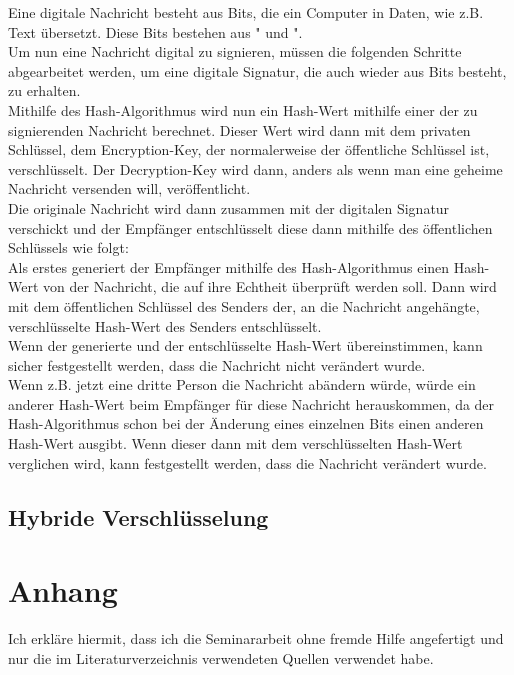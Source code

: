 \documentclass[14pt,a4paper]{scrartcl}
\begin{document}
	Eine digitale Nachricht besteht aus Bits, die ein Computer in Daten, wie z.B. Text übersetzt. Diese Bits bestehen aus " und ". \\ 
	Um nun eine Nachricht digital zu signieren, müssen die folgenden Schritte abgearbeitet werden, um eine digitale Signatur, die auch wieder aus Bits besteht, zu erhalten.\\
	Mithilfe des Hash-Algorithmus wird nun ein Hash-Wert mithilfe einer  der zu signierenden Nachricht berechnet. Dieser Wert wird dann mit dem privaten Schlüssel, dem Encryption-Key, der normalerweise der öffentliche Schlüssel ist, verschlüsselt. %
	Der Decryption-Key wird dann, anders als wenn man eine geheime Nachricht versenden will, veröffentlicht.\\
	Die originale Nachricht wird dann zusammen mit der digitalen Signatur verschickt und der Empfänger entschlüsselt diese dann mithilfe des öffentlichen Schlüssels wie folgt:\\
	Als erstes generiert der Empfänger mithilfe des Hash-Algorithmus einen Hash-Wert von der Nachricht, die auf ihre Echtheit überprüft werden soll. Dann wird mit dem öffentlichen Schlüssel des Senders der, an die Nachricht angehängte, verschlüsselte Hash-Wert des Senders entschlüsselt. \\
Wenn der generierte und der entschlüsselte Hash-Wert übereinstimmen, kann sicher festgestellt werden, dass die Nachricht nicht verändert wurde. \\
Wenn z.B. jetzt eine dritte Person die Nachricht abändern würde, würde ein anderer Hash-Wert beim Empfänger für diese Nachricht herauskommen, da der Hash-Algorithmus schon bei der Änderung eines einzelnen Bits einen anderen Hash-Wert ausgibt. Wenn dieser dann mit dem verschlüsselten Hash-Wert verglichen wird, kann festgestellt werden, dass die Nachricht verändert wurde.
	
	
	

	 	
	\subsection{Hybride Verschlüsselung}

\pagebreak
\section{Anhang}

\listoffigures
\pagebreak

\nocite{*}
\printbibliography
\pagebreak

\begin{flushleft}
Ich erkläre hiermit, dass ich die Seminararbeit ohne fremde Hilfe angefertigt und nur die im Literaturverzeichnis verwendeten Quellen verwendet habe.
\end{flushleft}
\end{document}
